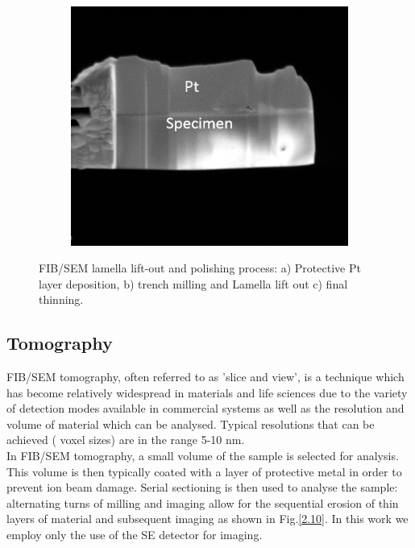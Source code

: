 \begin{figure}
\begin{subfigure}[b]{0.3\textwidth}
	\end{subfigure}%
	\hspace*{0.5cm}
	\begin{subfigure}[b]{0.3\textwidth}
		\centering
		\includegraphics[width=.95\linewidth]{Figs/Ch2/FIB3}
		\caption{}
	\end{subfigure}%
	
	\caption{FIB/SEM lamella lift-out and polishing process: a) Protective Pt layer deposition, b) trench milling and Lamella lift out c) final thinning.}
	\label{2.9}
\end{figure}

\FloatBarrier

\subsection{Tomography}
FIB/SEM tomography, often referred to as 'slice and view', is a technique which has become relatively widespread in materials and life sciences due to the variety of detection modes available in commercial systems as well as the resolution and volume of material which can be analysed. Typical resolutions that can be achieved ( voxel sizes) are in the range 5-10 nm.\\
In FIB/SEM tomography, a small volume of the sample is selected for analysis. This volume is then typically coated with a layer of protective metal in order to prevent ion beam damage. Serial sectioning is then used to analyse the sample: alternating turns of milling and imaging allow for the sequential erosion of thin layers of material and subsequent imaging as shown in Fig.\ref{2.10}. In this work we employ only the use of the SE detector for imaging.

